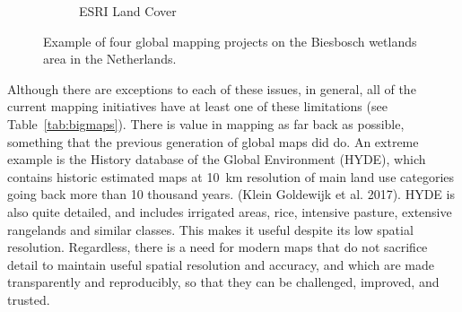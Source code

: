\begin{figure}[H]
\begin{subfigure}[b]{0.48\textwidth}
    \caption{ESRI Land Cover}
    \label{fig:lc_esri}
    \end{subfigure}
    \caption{Example of four global mapping projects on the Biesbosch wetlands area in the Netherlands.}
    \label{fig:bigmaps_biesbosch}
    \end{figure}

 
    Although there are exceptions to each of these issues, in general, all of the current mapping initiatives have at least one of these limitations (see Table\@~\ref{tab:bigmaps}). There is value in mapping as far back as possible, something that the previous generation of global maps did do. An extreme example is the History database of the Global Environment (HYDE), which contains historic estimated maps at 10~km resolution of main land use categories going back more than 10 thousand years. (Klein Goldewijk et al. 2017). HYDE is also quite detailed, and includes irrigated areas, rice, intensive pasture, extensive rangelands and similar classes. This makes it useful despite its low spatial resolution. Regardless, there is a need for modern maps that do not sacrifice detail to maintain useful spatial resolution and accuracy, and which are made transparently and reproducibly, so that they can be challenged, improved, and trusted.

